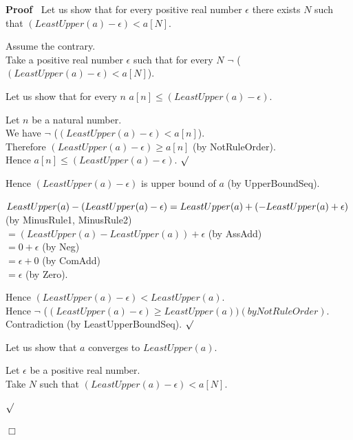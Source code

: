 \documentclass{article}
\newenvironment{forthel}{\begin{leftbar}}{\end{leftbar}}
\newenvironment{proof}{\noindent\textbf{Proof\ }}{\hspace*{\fill}$\Box$\medskip}
\newenvironment{subproof}{\begin{list}{}{}
		\item[\text{Proof}]}{\hfill $\surd$ \end{list}}
\newcommand{\dotequal}{=}
\begin{document}
\begin{forthel}
\begin{proof}
		\noindent Let us show that for every positive real number $\epsilon$ there exists $N$ such that $(LeastUpper(a) - \epsilon) < a[N]$.
		\begin{subproof}
			Assume the contrary.\\
			Take a positive real number $\epsilon$ such that for every $N$ \linebreak$\neg$ ($(LeastUpper(a) - \epsilon) < a[N]$).
			
			Let us show that for every $n$ $a[n] \leq (LeastUpper(a) - \epsilon)$.
			\begin{subproof}
				Let $n$ be a natural number.\\
				We have $\neg$ ($(LeastUpper(a) - \epsilon) < a[n]$).\\
				Therefore $(LeastUpper(a) - \epsilon) \geq a[n]$ (by NotRuleOrder).\\
				Hence $a[n] \leq (LeastUpper(a) - \epsilon)$.
			\end{subproof}
			Hence $(LeastUpper(a) - \epsilon)$ is upper bound of $a$ (by UpperBoundSeq).
			
			$LeastUpper(a) - (LeastUpper(a) - \epsilon)\\ \dotequal LeastUpper(a) + (-LeastUpper(a) + \epsilon)$ (by MinusRule1, MinusRule2)\\
			$\dotequal (LeastUpper(a) - LeastUpper(a)) + \epsilon$ (by AssAdd)\\
			$\dotequal 0 + \epsilon$ (by Neg)\\
			$\dotequal \epsilon + 0$ (by ComAdd)\\
			$\dotequal \epsilon$ (by Zero).

			Hence $(LeastUpper(a) - \epsilon) < LeastUpper(a)$.\\
			Hence $\neg$ ($(LeastUpper(a) - \epsilon) \geq LeastUpper(a)) (by NotRuleOrder)$.\\
			Contradiction (by LeastUpperBoundSeq).
		\end{subproof}
		
		\noindent Let us show that $a$ converges to $LeastUpper(a)$.
		
		\begin{subproof}
			Let $\epsilon$ be a positive real number.\\
			Take $N$ such that $(LeastUpper(a) - \epsilon) < a[N]$.
			

\end{subproof}
\end{proof}
\end{forthel}
\end{document}
